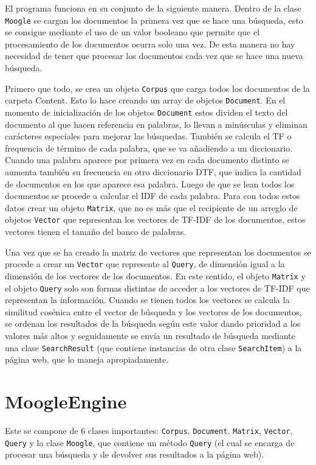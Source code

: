 \documentclass[a4paper,12pt]{article}
\begin{document}
    El programa funciona en su conjunto de la siguiente manera.
Dentro de la clase \texttt{Moogle} se cargan los documentos la primera vez que se hace una búsqueda,
esto se consigue mediante el uso de un valor booleano que permite que el 
procesamiento de los documentos ocurra solo una vez. De esta 
manera no hay necesidad de tener que procesar los documentos cada 
vez que se hace una nueva búsqueda.

    Primero que todo, se crea un objeto \texttt{Corpus} que carga todos los 
documentos de la carpeta Content. Esto lo hace creando un array de objetos \texttt{Document}. En
el momento de inicialización de los objetos \texttt{Document} estos 
dividen el texto del documento al que hacen referencia en 
palabras, lo llevan a minúsculas y eliminan carácteres especiales para mejorar las búsquedas.
También se calcula el TF o frequencia de término de cada 
palabra, que se va añadiendo a un diccionario. Cuando una 
palabra aparece por primera vez en cada documento distinto se 
aumenta también su frecuencia en otro diccionario DTF, que 
indica la cantidad de documentos en los que aparece esa palabra.
Luego de que se lean todos los documentos se procede a calcular 
el IDF de cada palabra. Para con todos estos datos crear un objeto
\texttt{Matrix}, que no es más que el recipiente de un arreglo de objetos 
\texttt{Vector} que representan los vectores de TF-IDF de los 
documentos, estos vectores tienen el tamaño del banco de 
palabras.

    Una vez que se ha creado la matriz de vectores que representan 
los documentos se procede a crear un \texttt{Vector} que represente al 
\texttt{Query}, de dimensión igual a la dimensión de los vectores de los documentos.
En este sentido, el objeto \texttt{Matrix} y el objeto \texttt{Query} solo son
formas distintas de acceder a los vectores de TF-IDF que 
representan la información.
    Cuando se tienen todos los vectores se calcula la similitud 
cosénica entre el vector de búsqueda y los vectores de los documentos, se ordenan los resultados de la búsqueda según este valor dando prioridad a
los valores más altos y seguidamente se envía un resultado de búsqueda mediante una clase \texttt{SearchResult} (que contiene instancias de
otra clase \texttt{SearchItem}) a la página web, que lo maneja apropiadamente.

\newpage
\section{MoogleEngine}
    Este se compone de 6 clases importantes: \texttt{Corpus}, \texttt{Document}, \texttt{Matrix},
\texttt{Vector}, \texttt{Query} y la clase \texttt{Moogle}, que contiene un método \texttt{Query}
(el cual se encarga de procesar una búsqueda y de devolver sus resultados a la página web).
\end{document}
